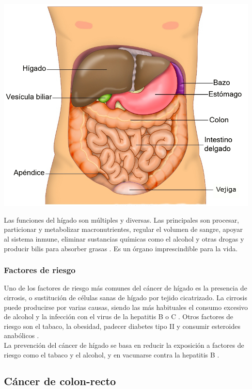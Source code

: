 \begin{center}
\includegraphics[width=.70\textwidth]{figuras/01_anatomia_higado.png} \\
\end{center}

Las funciones del hígado son múltiples y diversas. Las principales son procesar, particionar y metabolizar macronutrientes, regular el volumen de sangre, apoyar al sistema inmune, eliminar sustancias químicas como el alcohol y otras drogas y producir bilis para absorber grasas \cite{Trefts2017}. Es un órgano imprescindible para la vida.

\subsubsection{Factores de riesgo}

Uno de los factores de riesgo más comunes del cáncer de hígado es la presencia de cirrosis, o sustitución de células sanas de hígado por tejido cicatrizado. La cirrosis puede producirse por varias causas, siendo las más habituales el consumo excesivo de alcohol y la infección con el virus de la hepatitis B o C \cite{AmericanCancerSociety2019}. Otros factores de riesgo son el tabaco, la obesidad, padecer diabetes tipo II y consumir esteroides anabólicos \cite{AmericanCancerSociety2019, Marrero2005}.\\

La prevención del cáncer de hígado se basa en reducir la exposición a factores de riesgo como el tabaco y el alcohol, y en vacunarse contra la hepatitis B \cite{AmericanCancerSociety2019}.


\subsection{Cáncer de colon-recto}

